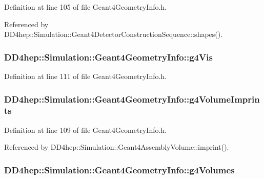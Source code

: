 Definition at line 105 of file Geant4GeometryInfo.h.

Referenced by DD4hep::Simulation::Geant4DetectorConstructionSequence::shapes().\hypertarget{class_d_d4hep_1_1_simulation_1_1_geant4_geometry_info_a1dc6d3c046072b0a6455c00e7fc76269}{
\subsubsection[{g4Vis}]{ {\bf DD4hep::Simulation::Geant4GeometryInfo::g4Vis}}}
\label{class_d_d4hep_1_1_simulation_1_1_geant4_geometry_info_a1dc6d3c046072b0a6455c00e7fc76269}


Definition at line 111 of file Geant4GeometryInfo.h.\hypertarget{class_d_d4hep_1_1_simulation_1_1_geant4_geometry_info_a62c7998ab4b27c040c67577a136e93e9}{
\subsubsection[{g4VolumeImprints}]{ {\bf DD4hep::Simulation::Geant4GeometryInfo::g4VolumeImprints}}}
\label{class_d_d4hep_1_1_simulation_1_1_geant4_geometry_info_a62c7998ab4b27c040c67577a136e93e9}


Definition at line 109 of file Geant4GeometryInfo.h.

Referenced by DD4hep::Simulation::Geant4AssemblyVolume::imprint().\hypertarget{class_d_d4hep_1_1_simulation_1_1_geant4_geometry_info_a6699981243bf97abf6c16e51a72dcabb}{
\subsubsection[{g4Volumes}]{ {\bf DD4hep::Simulation::Geant4GeometryInfo::g4Volumes}}}
\label{class_d_d4hep_1_1_simulation_1_1_geant4_geometry_info_a6699981243bf97abf6c16e51a72dcabb}


